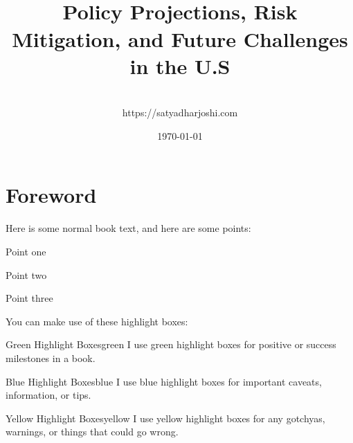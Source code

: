 \documentclass[a4paper,headinclude=on,footinclude=on,12pt,oneside]{scrbook}
\begin{document}
\title{\\\small{Policy Projections, Risk Mitigation, and Future Challenges in the U.S}}
\author{
    \\https://satyadharjoshi.com
}
\date{\today}

\maketitle
\tableofcontents

\listoffigures
{}

\listoflistings
{}

\chapter*{Foreword}


Here is some normal book text, and here are some points:

\begin{arrows}
\item Point one
\item Point two
\item Point three
\end{arrows}


You can make use of these highlight boxes:

\begin{highlightBox}{Green Highlight Boxes}{green}{\greenCheck}
I use green highlight boxes for positive or success milestones in a book.
\end{highlightBox}

\begin{highlightBox}{Blue Highlight Boxes}{blue}{\information}
I use blue highlight boxes for important caveats, information, or tips.
\end{highlightBox}

\begin{highlightBox}{Yellow Highlight Boxes}{yellow}{\warning}
I use yellow highlight boxes for any gotchyas, warnings, or things that could go wrong.
\end{highlightBox}
\end{document}
